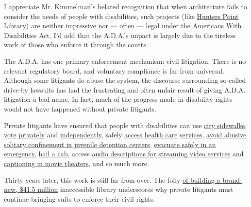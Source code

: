 I appreciate Mr. Kimmelman's belated recognition that when architecture
fails to consider the needs of people with disabilities, such projects
(like
\href{https://gothamist.com/news/new-41-million-hunters-point-library-has-one-major-flaw}{Hunters
Point Library}) are neither impressive nor --- often --- legal under the
Americans With Disabilities Act. I'd add that the A.D.A.'s impact is
largely due to the tireless work of those who enforce it through the
courts.

The A.D.A. has one primary enforcement mechanism: civil litigation.
There is no relevant regulatory board, and voluntary compliance is far
from universal. Although some litigants do abuse the system, the
discourse surrounding so-called drive-by lawsuits has had the
frustrating and often unfair result of giving A.D.A. litigation a bad
name. In fact, much of the progress made in disability rights would not
have happened without private litigants.

Private litigants have ensured that people with disabilities can use
\href{https://gothamist.com/news/nyc-agrees-to-make-all-sidewalk-curbs-accessible-to-the-disabled}{city
sidewalks},
\href{https://dralegal.org/case/eason-v-new-york-state-board-elections/}{vote}
\href{https://www.forbes.com/sites/peterslatin/2020/06/03/disabled-new-yorkers-can-vote--for-now/\#32c3ef4c5375}{privately}
and
\href{https://dralegal.org/press/landmark-decision-by-federal-appellate-court-vindicates-the-rights-of-voters-with-disabilities-in-new-york-city/}{independently},
safely \href{https://dralegal.org/case/metzler-v-kaiser/}{access}
\href{https://dralegal.org/case/sandra-lamb-v-nrad-medical-associates-et-al/}{health
care}
\href{https://dralegal.org/case/hinkle-et-al-v-kent-et-al/}{services},
\href{https://www.chicagotribune.com/la-me-ln-contra-costa-juvenile-education-20130808-story.html}{avoid
abusive solitary confinement in juvenile detention centers},
\href{https://www.nytimes.com/2013/11/08/nyregion/new-yorks-emergency-plans-violate-disabilities-act-judge-says.html}{evacuate
safely in an emergency},
\href{https://www.nytimes.com/2013/12/07/nyregion/wheelchair-settlement-poses-test-for-cab-industry.html}{hail
a cab}, access
\href{https://variety.com/2016/digital/news/netflix-audio-descriptions-blind-settlement-1201753569/}{audio
descriptions for streaming video services} and
\href{https://www.courthousenews.com/amc-movies-settles-class-action-blind/}{captioning
in movie theaters}, and so much more.

Thirty years later, this work is still far from over. The folly
\href{https://gothamist.com/news/lack-handicap-accessibility-flashy-new-hunters-point-library-sparks-lawsuit}{of
building a brand-new, \$41.5 million} inaccessible library underscores
why private litigants must continue bringing suits to enforce their
civil rights.

